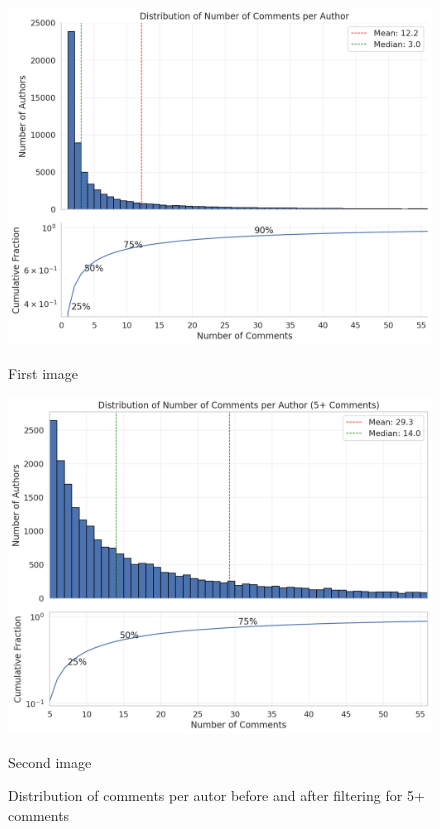 \documentclass[twoside]{ctuthesis}
\theoremstyle{plain}
\theoremstyle{definition}
\theoremstyle{note}
\begin{document}
\begin{figure}[htbp]
	\centering
	\begin{minipage}[b]{0.48\linewidth}
	  \centering
	  \includegraphics[width=\linewidth]{figures/comments_per_author.png}
	  \caption{First image}
	  \label{fig:left}
	\end{minipage}
	\hfill                  
	\begin{minipage}[b]{0.48\linewidth}
	  \centering
	  \includegraphics[width=\linewidth]{figures/comments_5_plus.png}
	  \caption{Second image}
	  \label{fig:right}
	\end{minipage}
	\caption{Distribution of comments per autor before and after filtering for 5+ comments}
	\label{fig:pair}
  \end{figure}
\end{document}
